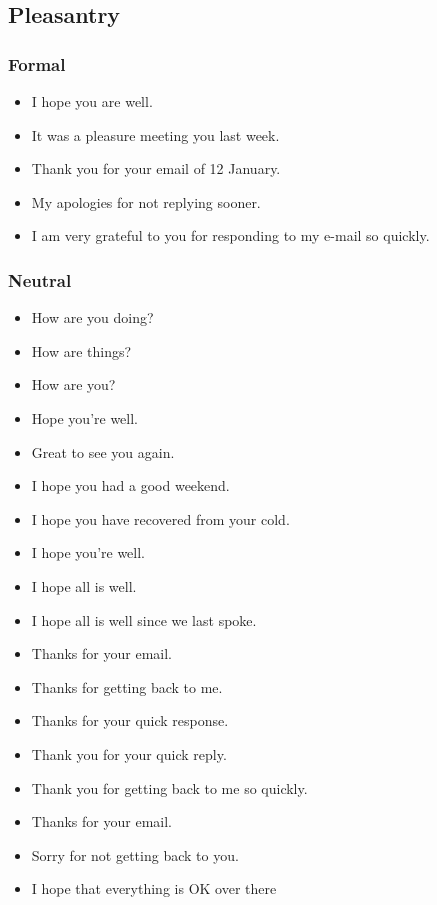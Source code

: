 \subsection{Pleasantry}
\subsubsection{Formal}
\begin{itemize}
\item I hope you are well.
\item It was a pleasure meeting you last week.
\item Thank you for your email of 12 January.
\item My apologies for not replying sooner.
\item I am very grateful to you for responding to my e-mail so quickly.
\end{itemize}

\subsubsection{Neutral}

\begin{itemize}
\item How are you doing?
\item How are things?
\item How are you?
\item Hope you're well.
\item Great to see you again.
\item I hope you had a good weekend.
\item I hope you have recovered from your cold.
\item I hope you're well.
\item I hope all is well.
\item I hope all is well since we last spoke.
\item Thanks for your email.
\item Thanks for getting back to me.
\item Thanks for your quick response.
\item Thank you for your quick reply.
\item Thank you for getting back to me so quickly.
\item Thanks for your email.
\item Sorry for not getting back to you.
\item I hope that everything is OK over there
\end{itemize}

